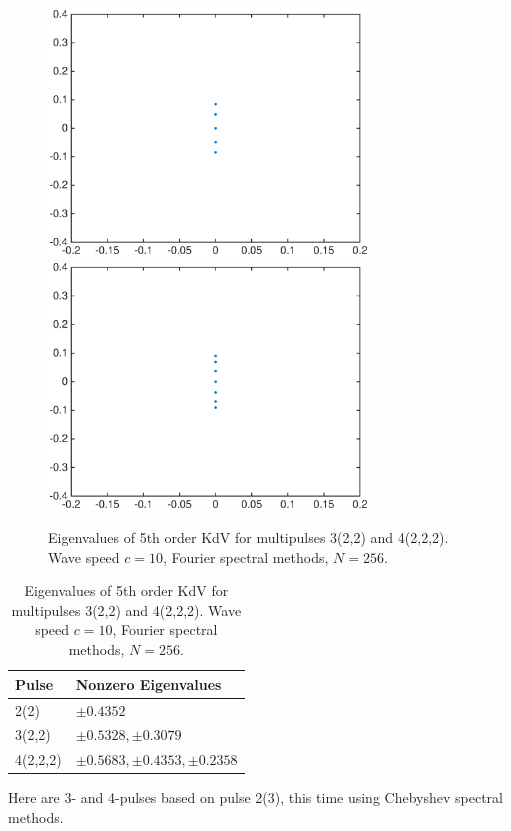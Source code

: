 \documentclass[12pt]{article}
\begin{document}
\begin{figure}[H]
	\includegraphics[width=8.5cm]{four10um1_3lambda}
	\includegraphics[width=8.5cm]{four10um1_4lambda}
	\caption{Eigenvalues of 5th order KdV for multipulses 3(2,2) and 4(2,2,2). Wave speed $c = 10$, Fourier spectral methods, $N = 256$.}
\end{figure}

\begin{table}[H]
\begin{tabular}{l|l}
  Pulse    &  Nonzero Eigenvalues \\ \hline
  2(2)     &     $\pm 0.4352$  \\ 
  3(2,2)   &     $\pm 0.5328, \pm 0.3079$   \\ 
  4(2,2,2) &     $\pm 0.5683, \pm 0.4353, \pm 0.2358 $  \\ 
\end{tabular}
\caption{Eigenvalues of 5th order KdV for multipulses 3(2,2) and 4(2,2,2). Wave speed $c = 10$, Fourier spectral methods, $N = 256$.}
\end{table}

 Here are 3- and 4-pulses based on pulse 2(3), this time using Chebyshev spectral methods.
\end{document}
